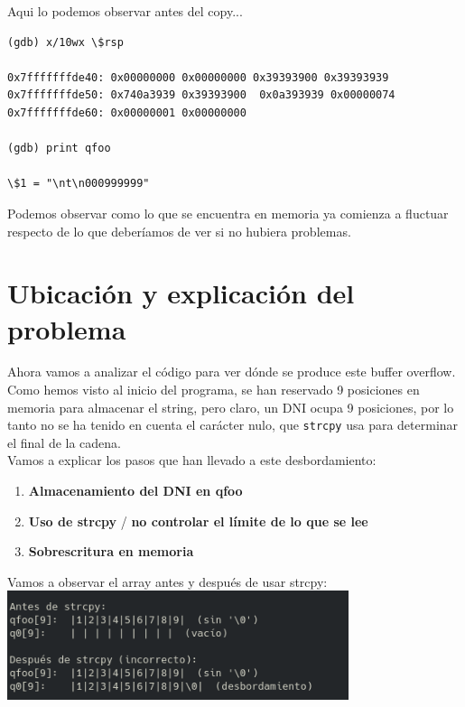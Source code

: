 \noindent Aqui lo podemos observar antes del copy...

\begin{verbatim}
(gdb) x/10wx \$rsp 

0x7fffffffde40: 0x00000000 0x00000000 0x39393900 0x39393939 
0x7fffffffde50: 0x740a3939 0x39393900  0x0a393939 0x00000074 
0x7fffffffde60: 0x00000001 0x00000000 

(gdb) print qfoo 

\$1 = "\nt\n000999999"

\end{verbatim}
\noindent Podemos observar como lo que se encuentra en memoria ya comienza a fluctuar respecto de lo que deberíamos de ver si no hubiera problemas.
\newpage
\section{Ubicación y explicación del problema}
\noindent Ahora vamos a analizar el código para ver dónde se produce este buffer overflow. Como hemos visto al inicio del programa, se han reservado 9 posiciones en memoria para almacenar el string, pero claro, un DNI ocupa 9 posiciones, por lo tanto no se ha tenido en cuenta el carácter nulo,  que \verb|strcpy| usa para determinar el final de la cadena.
\vspace{0.3cm}
\\
\noindent Vamos a explicar los pasos que han llevado a este desbordamiento:
\begin{enumerate}
    \item \textbf{Almacenamiento del DNI en qfoo}
    \item \textbf{Uso de strcpy} / \textbf{no controlar el límite de lo que se lee}
    \item \textbf{Sobrescritura en memoria}
\end{enumerate}
Vamos a observar el array antes y después de usar strcpy:
\\
\includegraphics[width=0.75\textwidth]{mainmatter/Fotos Codigo/imagenantesdespuesstrcpy.png} 
\\
